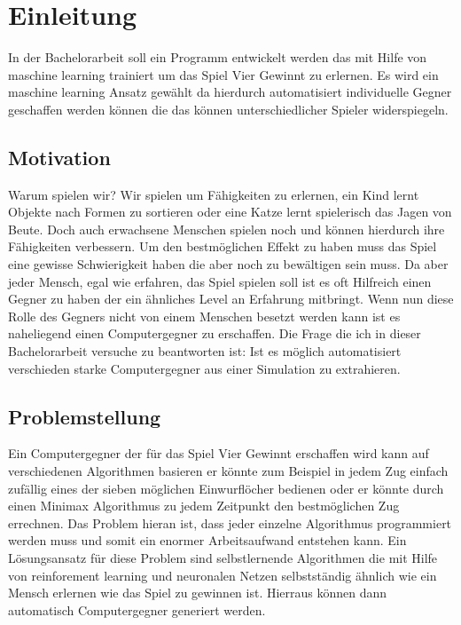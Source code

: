 \chapter{Einleitung}
\label{cha:Einleitung}

In der Bachelorarbeit soll ein Programm entwickelt werden das mit Hilfe von maschine learning trainiert um das Spiel Vier Gewinnt zu erlernen. 
Es wird ein maschine learning Ansatz gewählt da hierdurch automatisiert individuelle Gegner geschaffen werden können die das können unterschiedlicher Spieler widerspiegeln.%


\section{Motivation}
Warum spielen wir? Wir spielen um Fähigkeiten zu erlernen, ein Kind lernt Objekte nach Formen zu sortieren oder eine Katze lernt spielerisch das Jagen von Beute. Doch auch erwachsene Menschen spielen noch und können hierdurch ihre Fähigkeiten verbessern.  Um den bestmöglichen Effekt zu haben muss das Spiel eine gewisse Schwierigkeit haben die aber noch zu bewältigen sein muss. Da aber jeder Mensch, egal wie erfahren, das Spiel spielen soll ist es oft Hilfreich einen Gegner zu haben der ein ähnliches Level an Erfahrung mitbringt. Wenn nun diese Rolle des Gegners nicht von einem Menschen besetzt werden kann ist es naheliegend einen Computergegner zu erschaffen. Die Frage die ich in dieser Bachelorarbeit versuche zu beantworten ist: Ist es möglich automatisiert verschieden starke Computergegner aus einer Simulation zu extrahieren.


\section{Problemstellung}
Ein Computergegner der für das Spiel Vier Gewinnt erschaffen wird kann auf verschiedenen Algorithmen basieren er könnte zum Beispiel in jedem Zug einfach zufällig eines der sieben möglichen Einwurflöcher bedienen oder er könnte durch einen Minimax Algorithmus zu jedem Zeitpunkt den bestmöglichen Zug errechnen. 
Das Problem hieran ist, dass jeder einzelne Algorithmus programmiert werden muss und somit ein enormer Arbeitsaufwand entstehen kann.
Ein Lösungsansatz für diese Problem sind selbstlernende Algorithmen die mit Hilfe von reinforement learning und neuronalen Netzen selbstständig ähnlich wie ein Mensch erlernen wie das Spiel zu gewinnen ist.
Hierraus können dann automatisch Computergegner generiert werden.

